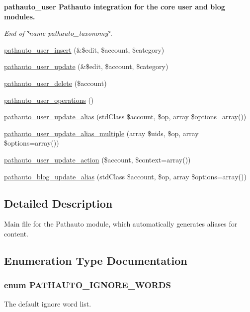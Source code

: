 \begin{Indent}{\bf pathauto\_\-user Pathauto integration for the core user and blog modules.}\par
{\em \label{_amgrp0ed2b800407307534803cc4fbb29b9d4}
 End of \char`\"{}name pathauto\_\-taxonomy\char`\"{}. }\begin{DoxyCompactItemize}
\item 
\hyperlink{pathauto_8module_afc367a3a7a9e84f3704b8baf5f3d73bc}{pathauto\_\-user\_\-insert} (\&\$edit, \$account, \$category)
\item 
\hyperlink{pathauto_8module_ac2569a0defd03ecce4977acb75c6db3e}{pathauto\_\-user\_\-update} (\&\$edit, \$account, \$category)
\item 
\hyperlink{pathauto_8module_a2ab8bcc3e1528ae3088dc9fef8ef55e8}{pathauto\_\-user\_\-delete} (\$account)
\item 
\hyperlink{pathauto_8module_a0f247e28488c4fe7f4306c14add7a565}{pathauto\_\-user\_\-operations} ()
\item 
\hyperlink{pathauto_8module_a201f74ecc823bdf66f3a58bf41dfa532}{pathauto\_\-user\_\-update\_\-alias} (stdClass \$account, \$op, array \$options=array())
\item 
\hyperlink{pathauto_8module_a764a68ac848f7a0699787a3c76cd1046}{pathauto\_\-user\_\-update\_\-alias\_\-multiple} (array \$uids, \$op, array \$options=array())
\item 
\hyperlink{pathauto_8module_a2fd42a248c056cf7d45629b64ed3ffb9}{pathauto\_\-user\_\-update\_\-action} (\$account, \$context=array())
\item 
\hyperlink{pathauto_8module_a7858e5dd55ede23c8dcee1da3513508a}{pathauto\_\-blog\_\-update\_\-alias} (stdClass \$account, \$op, array \$options=array())
\end{DoxyCompactItemize}
\end{Indent}


\subsection{Detailed Description}
Main file for the Pathauto module, which automatically generates aliases for content. 

\subsection{Enumeration Type Documentation}
\hypertarget{pathauto_8module_aacdee2c23d53cfb17f6b217d0e1d6f2e}{
\subsubsection[{PATHAUTO\_\-IGNORE\_\-WORDS}]{\setlength{\rightskip}{0pt plus 5cm}enum {\bf PATHAUTO\_\-IGNORE\_\-WORDS}}}
\label{pathauto_8module_aacdee2c23d53cfb17f6b217d0e1d6f2e}
The default ignore word list. 

